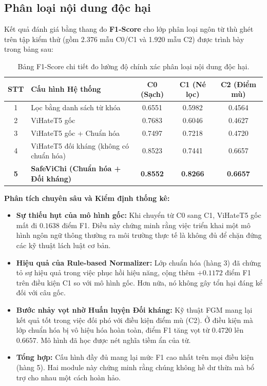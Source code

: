 \documentclass[12pt,a4paper]{article}
\begin{document}
\subsection{Phân loại nội dung độc hại}
Kết quả đánh giá bằng thang đo \textbf{F1-Score} cho lớp phân loại ngôn từ thù ghét trên tập kiểm thử (gồm 2.376 mẫu C0/C1 và 1.920 mẫu C2) được trình bày trong bảng sau:

\begin{table}[H]
\centering
\begin{tabular}{|c|p{7cm}|c|c|c|}
\hline
\textbf{STT} & \textbf{Cấu hình Hệ thống} & \textbf{C0 (Sạch)} & \textbf{C1 (Né lọc)} & \textbf{C2 (Điểm mù)} \\ \hline
1 & Lọc bằng danh sách từ khóa & 0.6551 & 0.5982 & 0.4564 \\ \hline
2 & ViHateT5 gốc & 0.7683 & 0.6046 & 0.4627 \\ \hline
3 & ViHateT5 gốc + Chuẩn hóa & 0.7497 & 0.7218 & 0.4720 \\ \hline
4 & ViHateT5 đối kháng (không có chuẩn hóa) & 0.8523 & 0.7441 & 0.6657 \\ \hline
\textbf{5} & \textbf{SafeViChi (Chuẩn hóa + Đối kháng)} & \textbf{0.8552} & \textbf{0.8266} & \textbf{0.6657} \\ \hline
\end{tabular}
\caption{Bảng F1-Score chi tiết đo lường độ chính xác phân loại nội dung độc hại.}
\end{table}

\textbf{Phân tích chuyên sâu và Kiểm định thống kê:}
\begin{itemize}
    \item \textbf{Sự thiếu hụt của mô hình gốc:} Khi chuyển từ C0 sang C1, ViHateT5 gốc mất đi $0.1638$ điểm F1. Điều này chứng minh rằng việc triển khai một mô hình ngôn ngữ thông thường ra môi trường thực tế là không đủ để chặn đứng các kỹ thuật lách luật cơ bản.
    \item \textbf{Hiệu quả của Rule-based Normalizer:} Lớp chuẩn hóa (hàng 3) đã chứng tỏ sự hiệu quả trong việc phục hồi hiệu năng, cộng thêm $+0.1172$ điểm F1 trên điều kiện C1 so với mô hình gốc. Hơn nữa, nó không gây tổn hại đáng kể đối với câu gốc.
    \item \textbf{Bước nhảy vọt nhờ Huấn luyện Đối kháng:} Kỹ thuật FGM mang lại kết quả tốt trong việc đối phó với điều kiện điểm mù (C2). Ở điều kiện mà lớp chuẩn hóa bị vô hiệu hóa hoàn toàn, điểm F1 tăng vọt từ $0.4720$ lên $0.6657$. Mô hình đã học được  nét nghĩa tiềm ẩn của từ.
    \item \textbf{Tổng hợp:} Cấu hình đầy đủ mang lại mức F1 cao nhất trên mọi điều kiện (hàng 5). Hai module này chứng minh rằng chúng không hề dư thừa mà bổ trợ cho nhau một cách hoàn hảo.
\end{itemize}
\end{document}
